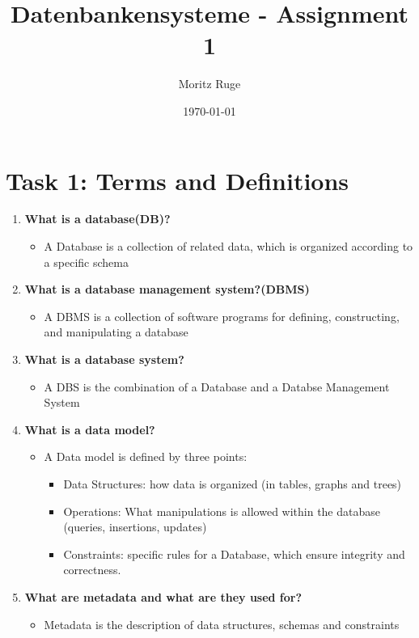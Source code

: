 \documentclass[10pt,a4paper]{article}
\title{Datenbankensysteme - Assignment 1}
\author{Moritz Ruge}
\date{\today} %
\begin{document}
\maketitle  %



\section*{Task 1: Terms and Definitions}
\begin{enumerate}
	\item \textbf{What is a database(DB)?}
	
	\begin{itemize}
		\item A Database is a collection of related data, which is organized according to a specific schema
	\end{itemize}
	
	\item \textbf{What is a database management system?(DBMS)}
	\begin{itemize}
		\item A DBMS is a collection of software programs for defining, constructing, and manipulating a database
	\end{itemize}
	
	\item \textbf{What is a database system?}
	\begin{itemize}
		\item A DBS is the combination of a Database and a Databse Management System
	\end{itemize}
	
	\item \textbf{What is a data model?}
	\begin{itemize}
		\item A Data model is defined by three points:
		\begin{itemize}
			\item Data Structures: how data is organized (in tables, graphs and trees)
			\item Operations: What manipulations is allowed within the database (queries, insertions, updates)
			\item Constraints: specific rules for a Database, which ensure integrity and correctness.
		\end{itemize}
	\end{itemize}
	
	\item \textbf{What are metadata and what are they used for?}
	\begin{itemize}
		\item Metadata is the description of data structures, schemas and constraints
	\end{itemize}
\end{enumerate}
\end{document}
